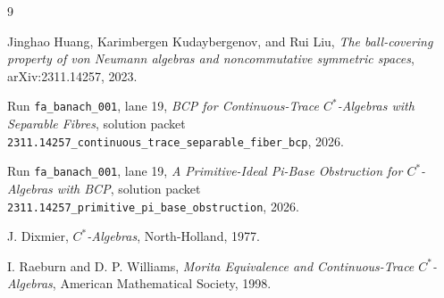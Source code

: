 \documentclass[11pt]{article}
\begin{document}
\begin{thebibliography}{9}

Jinghao Huang, Karimbergen Kudaybergenov, and Rui Liu,
\emph{The ball-covering property of von Neumann algebras and noncommutative
symmetric spaces},
arXiv:2311.14257, 2023.

Run \texttt{fa\_banach\_001}, lane 19,
\emph{BCP for Continuous-Trace \(C^*\)-Algebras with Separable Fibres},
solution packet
\texttt{2311.14257\_continuous\_trace\_separable\_fiber\_bcp}, 2026.

Run \texttt{fa\_banach\_001}, lane 19,
\emph{A Primitive-Ideal Pi-Base Obstruction for \(C^*\)-Algebras with BCP},
solution packet
\texttt{2311.14257\_primitive\_pi\_base\_obstruction}, 2026.

J. Dixmier,
\emph{\(C^*\)-Algebras},
North-Holland, 1977.

I. Raeburn and D. P. Williams,
\emph{Morita Equivalence and Continuous-Trace \(C^*\)-Algebras},
American Mathematical Society, 1998.

\end{thebibliography}
\end{document}
